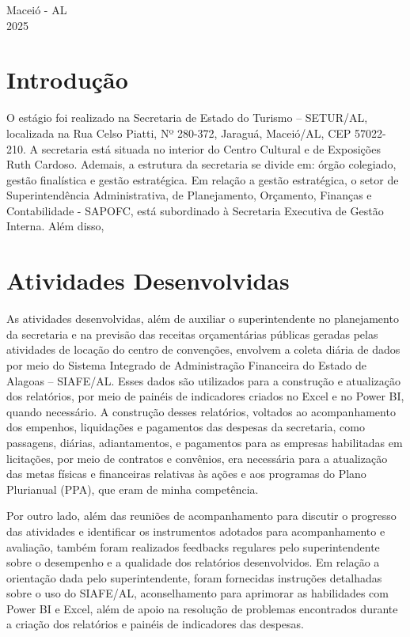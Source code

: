 \documentclass[12pt,a4paper]{article}
\begin{document}
	\vfill
	\begin{flushright}
		\centering Maceió - AL \\
		2025
	\end{flushright}
	
	\newpage
	
	\section{Introdução}
	\hspace*{1,5cm} O estágio foi realizado na Secretaria de Estado do Turismo – SETUR/AL, localizada na
	Rua Celso Piatti, Nº 280-372, Jaraguá, Maceió/AL, CEP 57022-210. A secretaria está situada
	no interior do Centro Cultural e de Exposições Ruth Cardoso. Ademais, a estrutura da secretaria
	se divide em: órgão colegiado, gestão finalística e gestão estratégica. Em relação a gestão
	estratégica, o setor de Superintendência Administrativa, de Planejamento, Orçamento, Finanças
	e Contabilidade - SAPOFC, está subordinado à Secretaria Executiva de Gestão Interna. Além disso,
	
	\hspace*{1,5cm}
	
	\section{Atividades Desenvolvidas}
	


	\hspace*{1,5cm} As atividades desenvolvidas, além de auxiliar o superintendente no planejamento da secretaria e 
	na previsão das receitas orçamentárias públicas geradas pelas atividades de locação do centro de convenções, 
	envolvem a coleta diária de dados por meio do Sistema Integrado de Administração Financeira do Estado de Alagoas – SIAFE/AL. 
	Esses dados são utilizados para a construção e atualização dos relatórios, por meio de painéis de indicadores criados no Excel e no Power BI, 
	quando necessário. A construção desses relatórios, voltados ao acompanhamento dos empenhos, liquidações e 
	pagamentos das despesas da secretaria, como passagens, diárias, adiantamentos, e pagamentos para as empresas
	habilitadas em licitações, por meio de contratos e convênios, era necessária para a atualização das metas 
 	físicas e financeiras relativas às ações e aos programas do Plano Plurianual (PPA), que eram de minha competência.  
	
	Por outro lado, além das reuniões de acompanhamento para discutir o progresso das atividades
	e identificar os instrumentos adotados para acompanhamento e avaliação, também foram realizados 
	feedbacks regulares pelo superintendente sobre o desempenho e a qualidade dos relatórios desenvolvidos. 
	Em relação a orientação dada pelo superintendente, foram fornecidas instruções detalhadas sobre o uso do SIAFE/AL, 
	aconselhamento para aprimorar as habilidades com Power BI e Excel, além de apoio na 
	resolução de problemas encontrados durante a criação dos relatórios e painéis de indicadores das despesas.  
 	
\end{document}
